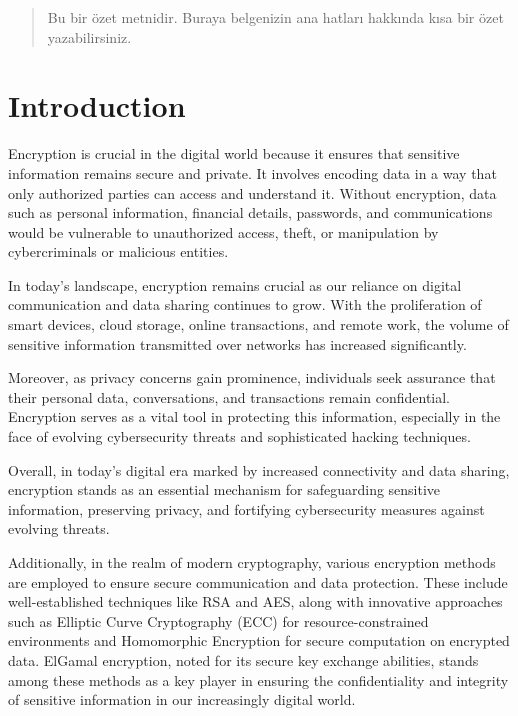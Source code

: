 \documentclass[12pt]{article}
\begin{document}
	
	
	\renewcommand{\abstractname}{Summary}
	\begin{abstract}
		Bu bir özet metnidir. Buraya belgenizin ana hatları hakkında kısa bir özet yazabilirsiniz.
	\end{abstract}
	

\clearpage %
	\section{Introduction}
Encryption is crucial in the digital world because it ensures that sensitive information remains secure and private. It involves encoding data in a way that only authorized parties can access and understand it. Without encryption, data such as personal information, financial details, passwords, and communications would be vulnerable to unauthorized access, theft, or manipulation by cybercriminals or malicious entities.

In today's landscape, encryption remains crucial as our reliance on digital communication and data sharing continues to grow. With the proliferation of smart devices, cloud storage, online transactions, and remote work, the volume of sensitive information transmitted over networks has increased significantly.

Moreover, as privacy concerns gain prominence, individuals seek assurance that their personal data, conversations, and transactions remain confidential. Encryption serves as a vital tool in protecting this information, especially in the face of evolving cybersecurity threats and sophisticated hacking techniques.

Overall, in today's digital era marked by increased connectivity and data sharing, encryption stands as an essential mechanism for safeguarding sensitive information, preserving privacy, and fortifying cybersecurity measures against evolving threats.

Additionally, in the realm of modern cryptography, various encryption methods are employed to ensure secure communication and data protection. These include well-established techniques like RSA and AES, along with innovative approaches such as Elliptic Curve Cryptography (ECC) for resource-constrained environments and Homomorphic Encryption for secure computation on encrypted data. ElGamal encryption, noted for its secure key exchange abilities, stands among these methods as a key player in ensuring the confidentiality and integrity of sensitive information in our increasingly digital world.
\end{document}
